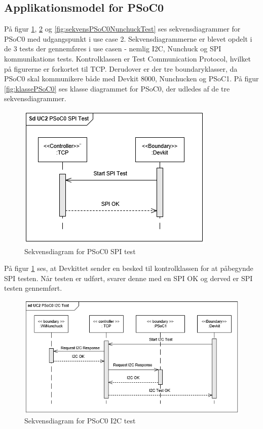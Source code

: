 \subsection{Applikationsmodel for PSoC0}
På figur \ref{fig:sekvensPSoC0SPITest}, \ref{fig:sekvensPSoC0I2CTest} og \ref{fig:sekvensPSoC0NunchuckTest} ses sekvensdiagrammer for PSoC0 med udgangspunkt i use case 2. Sekvensdiagrammerne er blevet opdelt i de 3 tests der gennemføres i use casen - nemlig I2C, Nunchuck og SPI kommunikations tests. Kontrolklassen er Test Communication Protocol, hvilket på figurerne er forkortet til TCP. Derudover er der tre boundaryklasser, da PSoC0 skal kommunikere både med Devkit 8000, Nunchucken og PSoC1. På figur \ref{fig:klassePSoC0} ses klasse diagrammet for PSoC0, der udledes af de tre sekvensdiagrammer.

\begin{figure}[H]
	\centering
	\includegraphics[width=.8\textwidth] {Systemarkitektur/images/SDPSoC0SPITest}
	\caption{Sekvensdiagram for PSoC0 SPI test}
	\label{fig:sekvensPSoC0SPITest}
\end{figure}

På figur \ref{fig:sekvensPSoC0SPITest} ses, at Devkittet sender en besked til kontrolklassen for at påbegynde SPI testen. Når testen er udført, svarer denne med en SPI OK og derved er SPI testen gennemført.

\begin{figure}[H]
	\centering
	\includegraphics[width=\textwidth] {Systemarkitektur/images/SDPSoC0I2CTest}
	\caption{Sekvensdiagram for PSoC0 I2C test}
	\label{fig:sekvensPSoC0I2CTest}
\end{figure}

